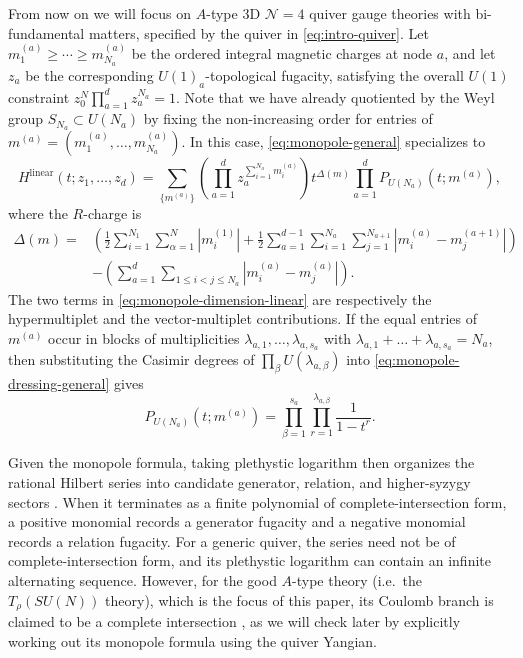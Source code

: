 \documentclass[12pt,a4paper]{article}
\begin{document}
From now on we will focus on $A$-type 3D $\mathcal N=4$ quiver gauge theories with bi-fundamental matters, specified by the quiver in \eqref{eq:intro-quiver}. 
Let
$m^{(a)}_1\geq\cdots\geq m^{(a)}_{N_a}$ be the ordered integral magnetic charges
at node $a$, and let $z_a$ be the corresponding $U(1)_a$-topological fugacity, satisfying the overall $U(1)$ constraint $z_0^N\prod_{a=1}^d z_a^{N_a}=1$. Note that we have already quotiented by the Weyl group $S_{N_a}\subset U(N_a)$ by fixing the non-increasing order for entries of $m^{(a)}=(m^{(a)}_1,\dots,m^{(a)}_{N_a})$. 
In this case, \eqref{eq:monopole-general} specializes to
\begin{equation}
 H^{\text{linear}}(t;z_1,\ldots,z_d)
 =\sum_{\{m^{(a)}\}}
 \left(\prod_{a=1}^{d}z_a^{\sum_{i=1}^{N_a}m_i^{(a)}}\right)
 t^{\Delta(m)}
 \prod_{a=1}^{d}P_{U(N_a)}(t;m^{(a)}),
 \label{eq:monopole-linear}
\end{equation}
where the $R$-charge is
\begin{align}
 \Delta(m)={}&
 \left(\frac12\sum_{i=1}^{N_1}\sum_{\alpha=1}^{N}|m_i^{(1)}|
 +\frac12\sum_{a=1}^{d-1}\sum_{i=1}^{N_a}
       \sum_{j=1}^{N_{a+1}}|m_i^{(a)}-m_j^{(a+1)}|\right)
 \nonumber\\
 &-\left(\sum_{a=1}^{d}\sum_{1\leq i<j\leq N_a}
       |m_i^{(a)}-m_j^{(a)}|\right).
 \label{eq:monopole-dimension-linear}
\end{align}
The two terms in \eqref{eq:monopole-dimension-linear} are respectively the
hypermultiplet and the vector-multiplet contributions.  If the equal
entries of $m^{(a)}$ occur in blocks of multiplicities
$\lambda_{a,1},\ldots,\lambda_{a,s_a}$ with $\lambda_{a,1}+\dots+\lambda_{a,s_a}=N_a$, then substituting the Casimir degrees of
$\prod_\beta U(\lambda_{a,\beta})$ into
\eqref{eq:monopole-dressing-general} gives
\begin{equation}
 P_{U(N_a)}(t;m^{(a)})
 =\prod_{\beta=1}^{s_a}\prod_{r=1}^{\lambda_{a,\beta}}
   \frac{1}{1-t^r}.
 \label{eq:monopole-dressing-unitary}
\end{equation}

Given the monopole formula, taking plethystic logarithm then organizes the rational Hilbert series into candidate
generator, relation, and higher-syzygy sectors
\cite{BenvenutiEtAl2006}.  When it terminates as a finite polynomial of complete-intersection form, a positive
monomial records a generator fugacity and a negative monomial records a relation
fugacity.  For a generic quiver, the series need not be of
complete-intersection form, and its plethystic logarithm can contain an infinite
alternating sequence.  
However, for the good $A$-type theory (i.e.\ the $T_\rho(SU(N))$ theory), which is the focus of this paper, its Coulomb branch is claimed to be a complete intersection \cite{CremonesiEtAl2014,Kumar2026}, as we will check later by explicitly working out its monopole formula using the quiver Yangian. 
\end{document}
